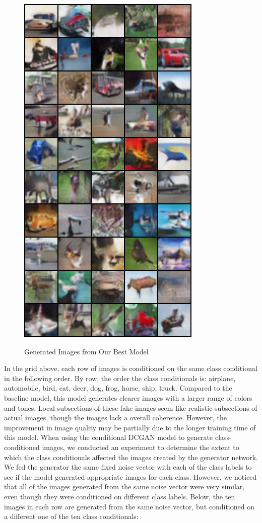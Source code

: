 \documentclass[a4paper]{article}
\begin{document}
\begin{figure}[H]
  \includegraphics[scale=0.5]{images/conditional_400_10x5_generated.png}
  \label{fig:boat1}
  \caption{Generated Images from Our Best Model}
\end{figure}
In the grid above, each row of images is conditioned on the same class conditional in the following order. By row, the order the class conditionals is: airplane, automobile, bird, cat, deer, dog, frog, horse, ship, truck. Compared to the baseline model, this model generates clearer images with a larger range of colors and tones. Local subsections of these fake images seem like realistic subsections of actual images, though the images lack a overall coherence. However, the improvement in image quality may be partially due to the longer training time of this model.
\newline
\newline
When using the conditional DCGAN model to generate class-conditioned images, we conducted an experiment to determine the extent to which the class conditionals affected the images created by the generator network. We fed the generator the same fixed noise vector with each of the class labels to see if the model generated appropriate images for each class. However, we noticed that all of the images generated from the same noise vector were very similar, even though they were conditioned on different class labels. Below, the ten images in each row are generated from the same noise vector, but conditioned on a different one of the ten class conditionals:
\end{document}
